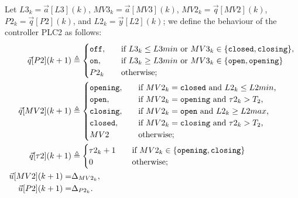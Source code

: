 {{Let $L3_k=\vec{a}[L3](k)$, $MV3_k=\vec{a}[MV3](k)$, $MV2_k=\vec{q}[MV2](k)$, $P2_k=\vec{q}[P2](k)$, and $L2_k=\vec{y}[L2](k)$; we define the behaviour of the controller PLC2 as follows:
\begin{align}
\vec{q}[P2](k+1)&\triangleq
    \begin{cases}
      \texttt{off},&\quad \text{if $L3_k\leq L3min$ or $MV3_k\in \set{\texttt{closed},\texttt{closing}}$},\\
      \texttt{on},&\quad \text{if $L3_k \geq L3min$ or $MV3_k\in \set{\texttt{open},\texttt{opening}}$}\\
      P2_k&\quad \text{otherwise;}
    \end{cases}\\
\vec{q}[MV2](k+1)&\triangleq
  \begin{cases}
    \texttt{opening},&\quad \text{if $MV2_k=\texttt{closed}$ and $L2_k\leq L2min$,}\\
    \texttt{open},&\quad \text{if $MV2_k=\texttt{opening}$ and $\tau2_k>T_2$,}\\
    \texttt{closing},&\quad \text{if $MV2_k=\texttt{open}$ and $L2_k\geq L2max$,}\\
    \texttt{closed},&\quad \text{if $MV2_k=\texttt{closing}$ and $\tau2_k>T_2$,}\\
    MV2&\quad \text{otherwise;}    
  \end{cases}\\
\vec{q}[\tau2](k+1)&\triangleq
\begin{cases}
  \tau2_k+1 &\quad \text{if $MV2_k\in \set{\texttt{opening},\texttt{closing}}$}\\
  0&\quad \text{otherwise;}    
\end{cases}\\
\vec{u}[MV2](k+1)=&\const_{MV2_k},\\%
\vec{u}[P2](k+1)=&\const_{P2_k}.%
\end{align}
}}
